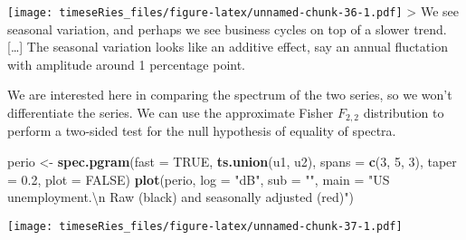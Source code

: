\documentclass[]{book}
\newenvironment{Shaded}{\begin{snugshade}}{\end{snugshade}}
\newcommand{\CharTok}[1]{\textcolor[rgb]{0.31,0.60,0.02}{#1}}
\newcommand{\DataTypeTok}[1]{\textcolor[rgb]{0.13,0.29,0.53}{#1}}
\newcommand{\DecValTok}[1]{\textcolor[rgb]{0.00,0.00,0.81}{#1}}
\newcommand{\FloatTok}[1]{\textcolor[rgb]{0.00,0.00,0.81}{#1}}
\newcommand{\KeywordTok}[1]{\textcolor[rgb]{0.13,0.29,0.53}{\textbf{#1}}}
\newcommand{\NormalTok}[1]{#1}
\newcommand{\OtherTok}[1]{\textcolor[rgb]{0.56,0.35,0.01}{#1}}
\newcommand{\StringTok}[1]{\textcolor[rgb]{0.31,0.60,0.02}{#1}}
\begin{document}
\texttt{[image: timeseRies\_files/figure-latex/unnamed-chunk-36-1.pdf]}
\textgreater{} We see seasonal variation, and perhaps we see business
cycles on top of a slower trend. {[}\ldots{}{]} The seasonal variation
looks like an additive effect, say an annual fluctation with amplitude
around 1 percentage point.

We are interested here in comparing the spectrum of the two series, so
we won't differentiate the series. We can use the approximate Fisher
\(F_{2,2}\) distribution to perform a two-sided test for the null
hypothesis of equality of spectra.

\begin{Shaded}
\begin{Highlighting}[]
\NormalTok{perio <-}\StringTok{ }\KeywordTok{spec.pgram}\NormalTok{(}\DataTypeTok{fast =} \OtherTok{TRUE}\NormalTok{, }\KeywordTok{ts.union}\NormalTok{(u1, u2), }\DataTypeTok{spans =} \KeywordTok{c}\NormalTok{(}\DecValTok{3}\NormalTok{, }\DecValTok{5}\NormalTok{, }\DecValTok{3}\NormalTok{), }\DataTypeTok{taper =} \FloatTok{0.2}\NormalTok{, }
    \DataTypeTok{plot =} \OtherTok{FALSE}\NormalTok{)}
\KeywordTok{plot}\NormalTok{(perio, }\DataTypeTok{log =} \StringTok{"dB"}\NormalTok{, }\DataTypeTok{sub =} \StringTok{""}\NormalTok{, }\DataTypeTok{main =} \StringTok{"US unemployment.}\CharTok{\textbackslash{}n}\StringTok{ Raw (black) and seasonally adjusted (red)"}\NormalTok{)}
\end{Highlighting}
\end{Shaded}

\texttt{[image: timeseRies\_files/figure-latex/unnamed-chunk-37-1.pdf]}
\end{document}

